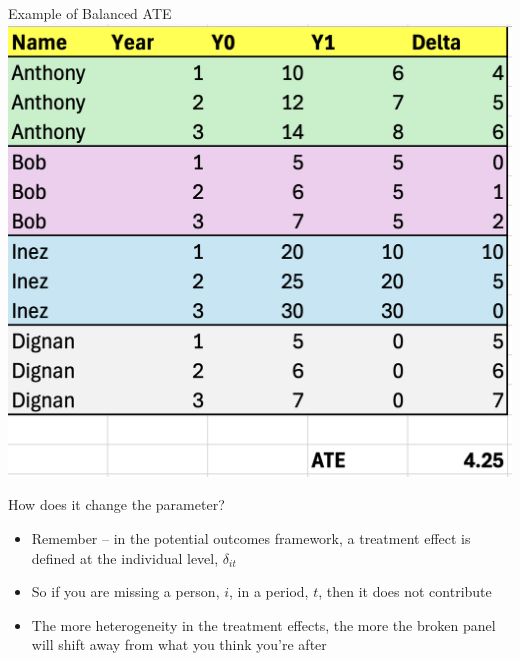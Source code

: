 \documentclass{beamer}
\begin{document}
\begin{frame}{Example of Balanced ATE}
  \centering
  \includegraphics[height=0.85\textheight,keepaspectratio]{./lecture_includes/balanced.png}
\end{frame}


\begin{frame}{How does it change the parameter?}

\begin{itemize}
\item Remember -- in the potential outcomes framework, a treatment effect is defined at the individual level, $\delta_{it}$
\item So if you are missing a person, $i$,  in a period, $t$, then it does not contribute
\item The more heterogeneity in the treatment effects, the more the broken panel will shift away from what you think you're after
\end{itemize}

\end{frame}
\end{document}
